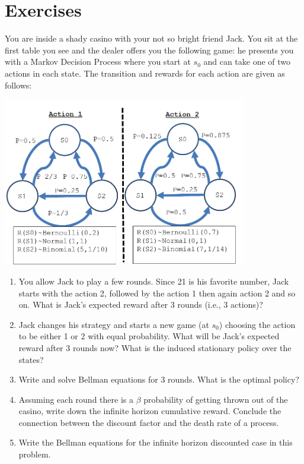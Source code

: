 \section{Exercises}

\begin{exercise}
You are inside a shady casino with your not so bright friend Jack. You sit at the first table you see and the dealer offers you the following game: he presents you with a Markov Decision Process where you start at ${s_0}$ and can take one of two actions in each state. The transition and rewards for each action are given as follows:
\begin{center}
\includegraphics[width=0.8\textwidth]{hw3_a}
\end{center}
\begin{enumerate}
  \item You allow Jack to play a few rounds. Since 21 is his favorite number, Jack starts with the action 2, followed by the action 1 then again action 2 and so on. What is Jack's expected reward after 3 rounds (i.e., 3 actions)?
  \item Jack changes his strategy and starts a new game (at ${s_0}$) choosing the action to be either 1 or 2 with equal probability. What will be Jack's expected reward after 3 rounds now? What is the induced stationary policy over the states?
  \item Write and solve Bellman equations for 3 rounds. What is the optimal policy?
  \item Assuming each round there is a $\beta $ probability of getting thrown out of the casino, write down the infinite horizon cumulative reward. Conclude the connection between the discount factor and the death rate of a process.
  \item Write the Bellman equations for the infinite horizon discounted case in this problem.
\end{enumerate}
\end{exercise}

